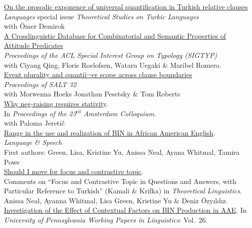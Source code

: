 \documentclass[11pt, a4paper]{article} %
\newcommand{\years}[1]{\marginnote{\scriptsize #1}} %
\newcommand{\btit}{\textit}
\begin{document}
\years{} \href{https://www.mdpi.com/2226-471X/8/3/170}{On the prosodic
exponence of universal quantification in Turkish relative clauses} \\
\emph{Languages} special issue \emph{Theoretical Studies on Turkic Languages} \\
with \"Omer Demirok \\[.25em]
\years{} \href{https://aclanthology.org/2023.sigtyp-1.7/}{A Crosslinguistic
Database for Combinatorial and Semantic Properties of Attitude Predicates} \\
\emph{Proceedings of the ACL Special Interest Group on Typology (SIGTYP)} \\
with Ciyang Qing, Floris Roelofsen, Wataru Uegaki \& Maribel Romero. \\[.25em]
\years{2022}
\href{https://journals.linguisticsociety.org/proceedings/index.php/SALT/article/view/32.023}{Event
plurality and quantiï¬er scope across clause boundaries} \\
\emph{Proceedings of SALT 32} \\
with Morwenna Hoeks Jonathan Pesetsky \& Tom Roberts \\[.25em]
\href{https://deniz.fr/pdfs/jeretic-ozyildiz-ACproceedings.pdf}{Why neg-raising
requires stativity}. \\ 
In  \emph{Proceedings of the 23$^{\text{rd}}$ Amsterdam Colloquium}. \\ 
with Paloma Jereti\v{c} \\[.25em]
\href{https://www.ncbi.nlm.nih.gov/pmc/articles/PMC9749017/}{Range in the use
and realization of BIN in African American English}. \\ 
\emph{Language \& Speech} \\
First authors: Green, Lisa, Kristine Yu, Anissa Neal, Ayana Whitmal, Tamira Powe
\\[.25em]
\years{2020} \href{http://deniz.fr/pdfs/2020-ozyildiz-on-kk.pdf}{Should I move
for focus and contrastive topic}. \\ 
Comments on ``Focus and Contrastive Topic in Questions and Answers, with Particular Reference to Turkish'' (Kamali \& Krifka) in \emph{Theoretical Linguistics}.\\[.25em]
\years{} Anissa Neal, Ayanna Whitmal, Lisa Green, Kristine Yu \& Deniz \"Ozy\i{}ld\i{}z. \href{https://repository.upenn.edu/pwpl/vol26/iss2/12/}{Investigation of the Effect of Contextual Factors on BIN Production in AAE}. In \btit{University of Pennsylvania Working Papers in Linguistics}: Vol.\ 26.\\[.25em]
\end{document}
